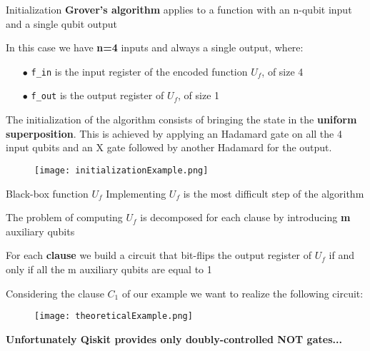 		\begin{frame}{Initialization}
			\small
			\textbf{Grover's algorithm} applies to a function with an n-qubit input and a single qubit output\\
			
			\vspace{0.2cm}
			
			In this case we have \textbf{n=4} inputs and always a single output, where:
			\begin{itemize}
				\item[$\bullet$] \texttt{f\_in} is the input register of the encoded function $U_f$, of size 4
				
				\item[$\bullet$] \texttt{f\_out} is the output register of $U_f$, of size 1
			\end{itemize}
			\begin{minipage}{0.5\textwidth}
				The initialization of the algorithm consists of bringing the state in the \textbf{uniform superposition}. This is achieved by applying an Hadamard gate on all the 4 input qubits and an X gate followed by another Hadamard for the output.
				\vspace{0.5cm}
			\end{minipage}\hfill
			\begin{minipage}{0.5\textwidth}
				\centering
				\begin{figure}[h]
					\centering
					\texttt{[image: initializationExample.png]}
				\end{figure}
			\end{minipage}
		\end{frame}
	
		\begin{frame}{Black-box function $U_f$}
			\small
			Implementing $U_f$ is the most difficult step of the algorithm\\
			
			\vspace{0.2cm}
			
			The problem of computing $U_f$ is decomposed for each clause by introducing \textbf{m} auxiliary qubits\\
			
			\vspace{0.2cm}
			
			For each \textbf{clause} we build a circuit that bit-flips the output register of $U_f$ if and only if all the m auxiliary qubits are equal to 1\\
			
			\vspace{0.2cm}
			
			Considering the clause $C_1$ of our example we want to realize the following circuit:
			\begin{figure}[h]
				\vspace{-0.3cm}
				\centering
				\texttt{[image: theoreticalExample.png]}
				\vspace{-0.3cm}
			\end{figure}
			\textbf{Unfortunately Qiskit provides only doubly-controlled NOT gates...}
		\end{frame}
	
